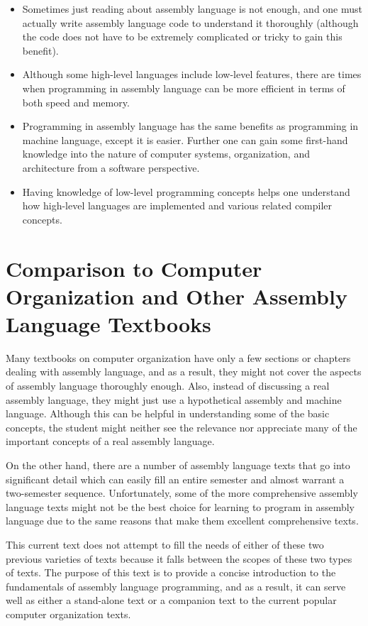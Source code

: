 \documentclass[10pt]{book}
\begin{document}
\begin{itemize}
  \item Sometimes just reading about assembly language is not enough, and one must actually write assembly language code to understand it thoroughly (although the code does not have to be extremely complicated or tricky to gain this benefit).
  \item Although some high-level languages include low-level features, there are times when programming in assembly language can be more efficient in terms of both speed and memory.
  \item Programming in assembly language has the same benefits as programming in machine language, except it is easier. Further one can gain some first-hand\\
knowledge into the nature of computer systems, organization, and architecture from a software perspective.
  \item Having knowledge of low-level programming concepts helps one understand how high-level languages are implemented and various related compiler concepts.
\end{itemize}


\section{Comparison to Computer Organization and Other Assembly Language Textbooks}
Many textbooks on computer organization have only a few sections or chapters dealing with assembly language, and as a result, they might not cover the aspects of assembly language thoroughly enough. Also, instead of discussing a real assembly language, they might just use a hypothetical assembly and machine language. Although this can be helpful in understanding some of the basic concepts, the student might neither see the relevance nor appreciate many of the important concepts of a real assembly language.

On the other hand, there are a number of assembly language texts that go into significant detail which can easily fill an entire semester and almost warrant a two-semester sequence. Unfortunately, some of the more comprehensive assembly language texts might not be the best choice for learning to program in assembly language due to the same reasons that make them excellent comprehensive texts.

This current text does not attempt to fill the needs of either of these two previous varieties of texts because it falls between the scopes of these two types of texts. The purpose of this text is to provide a concise introduction to the fundamentals of assembly language programming, and as a result, it can serve well as either a stand-alone text or a companion text to the current popular computer organization texts.
\end{document}
